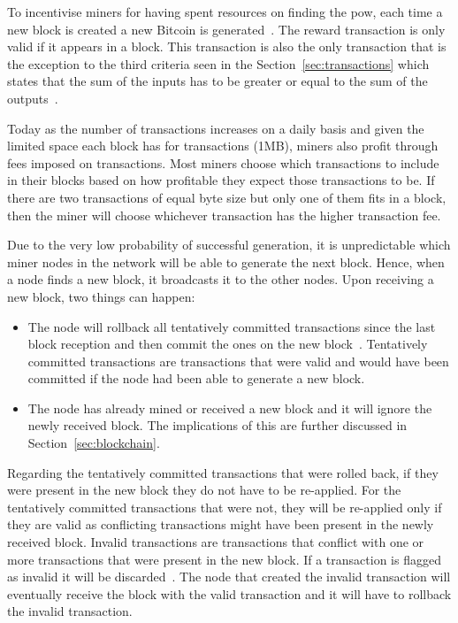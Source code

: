 To incentivise miners for having spent resources on finding the \acrshort{pow}, each time a new block is created a new Bitcoin is generated~\cite{decker2013information}. The reward transaction is only valid if it appears in a block. This transaction is also the only transaction that is the exception to the third criteria seen in the Section~\ref{sec:transactions} which states that the sum of the inputs has to be greater or equal to the sum of the outputs~\cite{decker2013information}.

Today as the number of transactions increases on a daily basis and given the limited space each block has for transactions (1MB), miners also profit through fees imposed on transactions. Most miners choose which transactions to include in their blocks based on how profitable they expect those transactions to be. If there are two transactions of equal byte size but only one of them fits in a block, then the miner will choose whichever transaction has the higher transaction fee.

Due to the very low probability of successful generation, it is unpredictable which miner nodes in the network will be able to generate the next block. Hence, when a node finds a new block, it broadcasts it to the other nodes. Upon receiving a new block, two things can happen:
\begin{itemize}
\item The node will rollback all tentatively committed transactions since the last block reception and then commit the ones on the new block~\cite{decker2013information}. Tentatively committed transactions are transactions that were valid and would have been committed if the node had been able to generate a new block.
\item The node has already mined or received a new block and it will ignore the newly received block. The implications of this are further discussed in Section~\ref{sec:blockchain}.
\end{itemize}

Regarding the tentatively committed transactions that were rolled back, if they were present in the new block they do not have to be re-applied. For the tentatively committed transactions that were not, they will be re-applied only if they are valid as conflicting transactions might have been present in the newly received block. Invalid transactions are transactions that conflict with one or more transactions that were present in the new block. If a transaction is flagged as invalid it will be discarded~\cite{decker2013information}. The node that created the invalid transaction will eventually receive the block with the valid transaction and it will have to rollback the invalid transaction.

